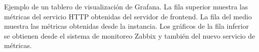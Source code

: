 \label{fig:grafana}
\captionStyle
Ejemplo de un tablero de visualización de Grafana. La fila superior
muestra las métricas del servicio HTTP obtenidas del servidor de
frontend. La fila del medio muestra las métricas obtenidas desde la
instancia. Los gráficos de la fila inferior se obtienen desde el
sistema de monitoreo Zabbix y también del nuevo servicio de métricas.
